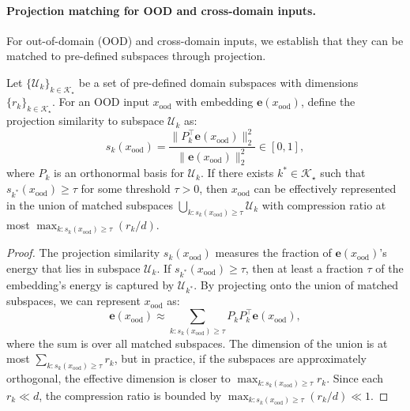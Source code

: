 \paragraph{Projection matching for OOD and cross-domain inputs.}
For out-of-domain (OOD) and cross-domain inputs, we establish that they can be matched to pre-defined subspaces through projection.

\begin{theorem}
\label{thm:ood_matching}
Let $\{\mathcal{U}_k\}_{k \in \mathcal{K}_\star}$ be a set of pre-defined domain subspaces with dimensions $\{r_k\}_{k \in \mathcal{K}_\star}$.
For an OOD input $x_{\mathrm{ood}}$ with embedding $\mathbf{e}(x_{\mathrm{ood}})$, define the projection similarity to subspace $\mathcal{U}_k$ as:
\begin{equation}
s_k(x_{\mathrm{ood}}) = \frac{\|P_k^\top \mathbf{e}(x_{\mathrm{ood}})\|_2^2}{\|\mathbf{e}(x_{\mathrm{ood}})\|_2^2} \in [0,1],
\end{equation}
where $P_k$ is an orthonormal basis for $\mathcal{U}_k$.
If there exists $k^* \in \mathcal{K}_\star$ such that $s_{k^*}(x_{\mathrm{ood}}) \geq \tau$ for some threshold $\tau > 0$, then $x_{\mathrm{ood}}$ can be effectively represented in the union of matched subspaces $\bigcup_{k: s_k(x_{\mathrm{ood}}) \geq \tau} \mathcal{U}_k$ with compression ratio at most $\max_{k: s_k(x_{\mathrm{ood}}) \geq \tau} (r_k/d)$.
\end{theorem}

\begin{proof}
The projection similarity $s_k(x_{\mathrm{ood}})$ measures the fraction of $\mathbf{e}(x_{\mathrm{ood}})$'s energy that lies in subspace $\mathcal{U}_k$.
If $s_{k^*}(x_{\mathrm{ood}}) \geq \tau$, then at least a fraction $\tau$ of the embedding's energy is captured by $\mathcal{U}_{k^*}$.
By projecting onto the union of matched subspaces, we can represent $x_{\mathrm{ood}}$ as:
\begin{equation}
\mathbf{e}(x_{\mathrm{ood}}) \approx \sum_{k: s_k(x_{\mathrm{ood}}) \geq \tau} P_k P_k^\top \mathbf{e}(x_{\mathrm{ood}}),
\end{equation}
where the sum is over all matched subspaces.
The dimension of the union is at most $\sum_{k: s_k(x_{\mathrm{ood}}) \geq \tau} r_k$, but in practice, if the subspaces are approximately orthogonal, the effective dimension is closer to $\max_{k: s_k(x_{\mathrm{ood}}) \geq \tau} r_k$.
Since each $r_k \ll d$, the compression ratio is bounded by $\max_{k: s_k(x_{\mathrm{ood}}) \geq \tau} (r_k/d) \ll 1$.
\end{proof}

